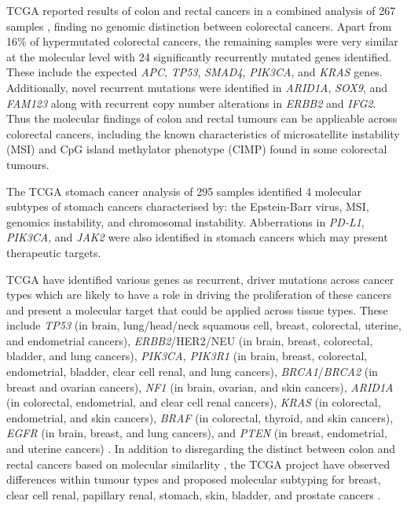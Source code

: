 TCGA reported results of colon and rectal cancers in a combined analysis of 267 samples \citep{TCGA2012CRC}, finding no genomic distinction between colorectal cancers. Apart from 16\% of hypermutated colorectal cancers, the remaining samples were very similar at the molecular level with 24 significantly recurrently mutated genes identified. These include the expected \textit{APC}, \textit{TP53}, \textit{SMAD4}, \textit{PIK3CA}, and \textit{KRAS} genes. Additionally, novel recurrent mutations were identified in \textit{ARID1A}, \textit{SOX9}, and  \textit{FAM123} along with recurrent copy number alterations in  \textit{ERBB2} and  \textit{IFG2}. Thus the molecular findings of colon and rectal tumours can be applicable across colorectal cancers, including the known characteristics of microsatellite instability (MSI) and CpG island methylator phenotype (CIMP) found in some colorectal tumours.

The TCGA stomach cancer analysis of 295 samples \citep{TCGA2014GC} identified 4 molecular subtypes of stomach cancers characterised by: the Epstein-Barr virus, MSI, genomics instability, and chromosomal instability. Abberrations in  \textit{PD-L1}, \textit{PIK3CA}, and \textit{JAK2} were also identified in stomach cancers which may present therapeutic targets.


TCGA have identified various genes as recurrent, driver mutations across cancer types which are likely to have a role in driving the proliferation of these cancers and present a molecular target that could be applied across tissue types. These include \textit{TP53} (in brain, lung/head/neck squamous cell, breast, colorectal, uterine, and endometrial cancers), \textit{ERBB2}/HER2/NEU (in brain, breast, colorectal, bladder, and lung cancers), \textit{PIK3CA, PIK3R1} (in brain, breast, colorectal, endometrial, bladder, clear cell renal, and lung cancers), \textit{BRCA1}/\textit{BRCA2} (in breast and ovarian cancers), \textit{NF1} (in brain, ovarian, and skin cancers), \textit{ARID1A} (in colorectal, endometrial, and clear cell renal cancers), \textit{KRAS} (in colorectal, endometrial, and skin cancers), \textit{BRAF} (in colorectal, thyroid, and skin cancers), \textit{EGFR} (in brain, breast, and lung cancers), and \textit{PTEN} (in breast, endometrial, and uterine cancers) \citep{TCGA2008GBM, TCGA2011OV, TCGA2012, TCGA2012LUSC, TCGA2012CRC, TCGA2013RCC, TCGA2013ENDO, TCGA2014BL, TCGA2014LU, TCGA2014TH, TCGA2014GC, TCGA2015LBC, TCGA2015HNSC, TCGA2015SK, TCGA2017CERV, TCGA2017UT}. In addition to disregarding the distinct between colon and rectal cancers based on molecular similarlity \citep{TCGA2012CRC}, the TCGA project have observed differences within tumour types and proposed molecular subtyping for breast, clear cell renal, papillary renal, stomach, skin, bladder, and prostate cancers \citep{TCGA2012, TCGA2012LUSC, TCGA2012CRC, TCGA2013RCC, TCGA2014BL, TCGA2014GC, TCGA2015LBC, TCGA2015SK, TCGA2016PRC, TCGA2015PR}.

